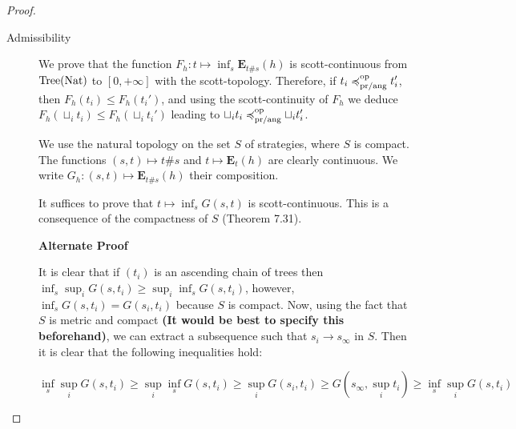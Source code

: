 \begin{proof}
    \begin{description}
        \item[Admissibility]
            We prove that the function $F_h : t \mapsto \inf_s  \mathbf{E}_{t\#s} (h)$
            is scott-continuous from $\textnormal{Tree}(\textnormal{Nat})$ to $[0,+\infty]$ with the
            scott-topology. Therefore, if $t_i \preccurlyeq^{\text{op}}_{\text{pr/ang}} t_i'$,
            then $F_h(t_i) \leq F_h (t_i')$, and using the scott-continuity
            of $F_h$ we deduce $F_h (\sqcup_i t_i) \leq F_h (\sqcup_i t_i')$
            leading to $\sqcup_i t_i \preccurlyeq^{\text{op}}_{\text{pr/ang}} \sqcup_i t_i'$.

            We use the natural topology on the set $S$ of strategies, where 
            $S$ is compact. The functions $(s,t) \mapsto t \# s$  
            and $t \mapsto \mathbf{E}_t (h)$ are clearly continuous.
            We write $G_h : (s,t) \mapsto \mathbf{E}_{t \# s} (h)$ their composition.

            It suffices to prove that $t \mapsto \inf_s G(s,t)$ is
            scott-continuous. This is a consequence of the compactness of $S$ 
            \cite{AndreaShalk}
            (Theorem 7.31). 

            \textbf{Alternate Proof}

            It is clear that if $(t_i)$ is an ascending chain of trees
            then 
            $\inf_s \sup_i G(s,t_i) \geq \sup_i \inf_s G(s,t_i)$,
            however, $\inf_s G(s,t_i) = G(s_i, t_i)$ because $S$ is compact.
            Now, using the fact that $S$ is metric and compact
            \textbf{(It would be best to specify this beforehand)}, we can extract 
            a subsequence such that $s_i \rightarrow s_\infty$ in $S$. Then
            it is clear that the following inequalities hold:

            \begin{equation*}
                \inf_s \sup_i G(s,t_i)
                \geq 
                \sup_i \inf_s G(s,t_i)
                \geq 
                \sup_i G(s_i, t_i)
                \geq 
                G(s_\infty, \sup_i t_i)
                \geq
                \inf_s \sup_i G(s,t_i)
            \end{equation*}


\end{description}
\end{proof}
